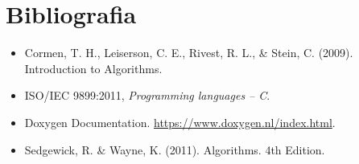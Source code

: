 \documentclass[a4paper,12pt]{article}
\begin{document}
\newpage

\section{Bibliografia}
\begin{itemize}
    \item Cormen, T. H., Leiserson, C. E., Rivest, R. L., \& Stein, C. (2009). Introduction to Algorithms.
    \item ISO/IEC 9899:2011, \textit{Programming languages – C}.
    \item Doxygen Documentation. \url{https://www.doxygen.nl/index.html}.
    \item Sedgewick, R. \& Wayne, K. (2011). Algorithms. 4th Edition.
\end{itemize}
\end{document}
